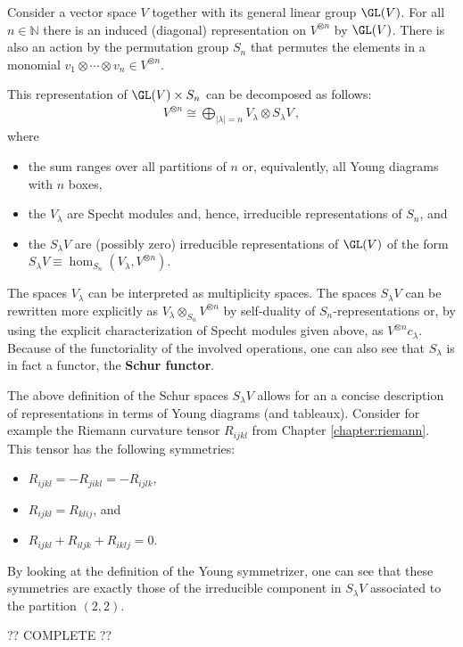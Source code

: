     Consider a vector space $V$ together with its general linear group $\GL(V)$. For all $n\in\mathbb{N}$ there is an induced (diagonal) representation on $V^{\otimes n}$ by $\GL(V)$. There is also an action by the permutation group $S_n$ that permutes the elements in a monomial $v_1\otimes\cdots\otimes v_n\in V^{\otimes n}$.
    \begin{theorem}
        This representation of $\GL(V)\times S_n$ can be decomposed as follows:
        \begin{gather}
            V^{\otimes n}\cong\bigoplus_{|\lambda|=n}V_\lambda\otimes S_\lambda V\,,
        \end{gather}
        where
        \begin{itemize}
            \item the sum ranges over all partitions of $n$ or, equivalently, all Young diagrams with $n$ boxes,
            \item the $V_\lambda$ are Specht modules and, hence, irreducible representations of $S_n$, and
            \item the $S_\lambda V$ are (possibly zero) irreducible representations of $\GL(V)$ of the form $S_\lambda V \equiv\hom_{S_n}(V_\lambda,V^{\otimes n})$.
        \end{itemize}
    \end{theorem}
    The spaces $V_\lambda$ can be interpreted as multiplicity spaces. The spaces $S_\lambda V$ can be rewritten more explicitly as $V_\lambda\otimes_{S_n} V^{\otimes n}$ by self-duality of $S_n$-representations or, by using the explicit characterization of Specht modules given above, as $V^{\otimes n}c_\lambda$. Because of the functoriality of the involved operations, one can also see that $S_\lambda$ is in fact a functor, the \textbf{Schur functor}.

    \begin{example}
        The above definition of the Schur spaces $S_\lambda V$ allows for an a concise description of representations in terms of Young diagrams (and tableaux). Consider for example the Riemann curvature tensor $R_{ijkl}$ from Chapter \ref{chapter:riemann}. This tensor has the following symmetries:
        \begin{itemize}
            \item $R_{ijkl} = -R_{jikl} = -R_{ijlk}$,
            \item $R_{ijkl} = R_{klij}$, and
            \item $R_{ijkl} + R_{iljk} + R_{iklj} = 0$.
        \end{itemize}
        By looking at the definition of the Young symmetrizer, one can see that these symmetries are exactly those of the irreducible component in $S_\lambda V$ associated to the partition $(2,2)$.

        ?? COMPLETE ??
    \end{example}


